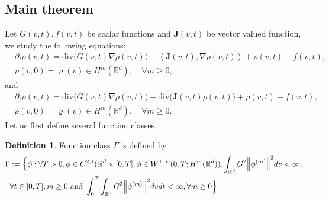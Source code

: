 \documentclass[a4paper, 11pt]{article}
\newcommand{\inner}[2]{\left< #1 , #2 \right>}
\newcounter{results}[section]
\theoremstyle{plain}
\theoremstyle{remark}
\theoremstyle{definition}
\newtheorem{definition}[results]{Definition}
\renewcommand{\div}{\mathrm{div}}
\newcommand{\intd}{\int_{\mathbb{R}^d}}
\newcommand{\intt}{\int_0^T}
\newcommand{\J}{\boldsymbol{J}}
\begin{document}
        \subsection{Main theorem}
		Let $G(v,t),f(v,t)$ be scalar functions and $\J(v,t)$ be vector valued function, we study the following equations:
		\begin{equation}\label{eq:g1}
			\begin{aligned}
&\partial_t\rho(v,t)=\div\Big(G(v,t)\nabla\rho(v,t)\Big)+\inner{\J(v,t)}{\nabla\rho(v,t)}+\rho(v,t)+f(v,t),\\
                &\rho(v,0)=\varrho(v)\in H^m(\mathbb{R}^d),\quad\forall m\geq 0,
			\end{aligned}
		\end{equation}
        and 
        \begin{equation}\label{eqg:2}
			\begin{aligned}
&\partial_t\rho(v,t)=\div\Big(G(v,t)\nabla\rho(v,t)\Big)-\div{\Big(\J(v,t)\rho(v,t)\Big)}+\rho(v,t)+f(v,t),\\
                &\rho(v,0)=\varrho(v)\in H^m(\mathbb{R}^d),\quad\forall m\geq 0.
			\end{aligned}
		\end{equation}
Let us first define several function classes.
\begin{definition}Function class $\Gamma$ is defined by
    \begin{equation}
	\begin{aligned}
		\Gamma&:=\Big\{\phi:\forall T>0, \phi\in C^{2,1}(\mathbb{R}^d\times [0,T], \phi\in  W^{1,\infty}(0,T;H^m(\mathbb{R}^d)), \intd G^2\norm{\phi^{(m)}}^2dv<\infty,\\
        &\forall t\in [0,T],m\geq 0\text{ and }\intt\intd G^3\norm{\phi^{(m)}}^2dvdt<\infty, \forall m\geq0\Big\}.
	\end{aligned}
\end{equation}
\end{definition}
\end{document}
